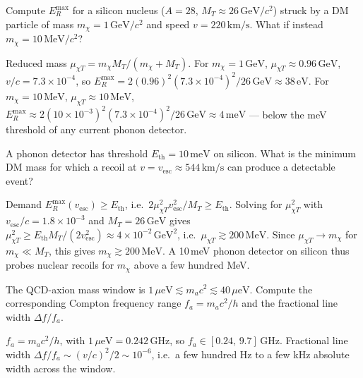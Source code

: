 \begin{exercise}
Compute $E_R^\text{max}$ for a silicon nucleus ($A=28$,
$M_T\approx 26\,\text{GeV}/c^2$) struck by a DM particle of mass
$m_\chi=1\,\text{GeV}/c^2$ and speed $v=220\,\text{km}/\text{s}$.
What if instead $m_\chi=10\,\text{MeV}/c^2$?
\begin{solution}
Reduced mass $\mu_{\chi T}=m_\chi M_T/(m_\chi+M_T)$.
For $m_\chi=1\,\text{GeV}$, $\mu_{\chi T}\approx 0.96\,\text{GeV}$,
$v/c=7.3\times 10^{-4}$, so
$E_R^\text{max}=2(0.96)^2(7.3\times 10^{-4})^2/26\,\text{GeV}\approx 38\,\text{eV}$.
For $m_\chi=10\,\text{MeV}$, $\mu_{\chi T}\approx 10\,\text{MeV}$,
$E_R^\text{max}\approx 2(10\times 10^{-3})^2(7.3\times 10^{-4})^2/26\,\text{GeV}
\approx 4\,\text{meV}$ --- below the meV threshold of any current
phonon detector.
\end{solution}
\end{exercise}

\begin{exercise}
A phonon detector has threshold $E_\text{th}=10\,\text{meV}$ on
silicon. What is the minimum DM mass for which a recoil at
$v=v_\text{esc}\approx 544\,\text{km}/\text{s}$ can produce a
detectable event?
\begin{solution}
Demand $E_R^\text{max}(v_\text{esc})\geq E_\text{th}$, i.e.\
$2\mu_{\chi T}^2 v_\text{esc}^2/M_T\geq E_\text{th}$. Solving for
$\mu_{\chi T}^2$ with $v_\text{esc}/c=1.8\times 10^{-3}$ and
$M_T=26\,\text{GeV}$ gives
$\mu_{\chi T}^2\geq E_\text{th}M_T/(2 v_\text{esc}^2)
\approx 4\times 10^{-2}\,\text{GeV}^2$, i.e.\
$\mu_{\chi T}\gtrsim 200\,\text{MeV}$. Since
$\mu_{\chi T}\to m_\chi$ for $m_\chi\ll M_T$, this gives
$m_\chi\gtrsim 200\,\text{MeV}$. A 10\,meV phonon detector on
silicon thus probes nuclear recoils for $m_\chi$ above a few
hundred MeV.
\end{solution}
\end{exercise}

\begin{exercise}
The QCD-axion mass window is $1\,\mu\text{eV}\lesssim m_a c^2\lesssim
40\,\mu\text{eV}$. Compute the corresponding Compton frequency
range $f_a=m_a c^2/h$ and the fractional line width
$\Delta f/f_a$.
\begin{solution}
$f_a=m_a c^2/h$, with $1\,\mu\text{eV}=0.242\,\text{GHz}$, so
$f_a\in[0.24,\,9.7]\,\text{GHz}$. Fractional line width
$\Delta f/f_a\sim (v/c)^2/2\sim 10^{-6}$, i.e.\ a few hundred Hz to
a few kHz absolute width across the window.
\end{solution}
\end{exercise}

